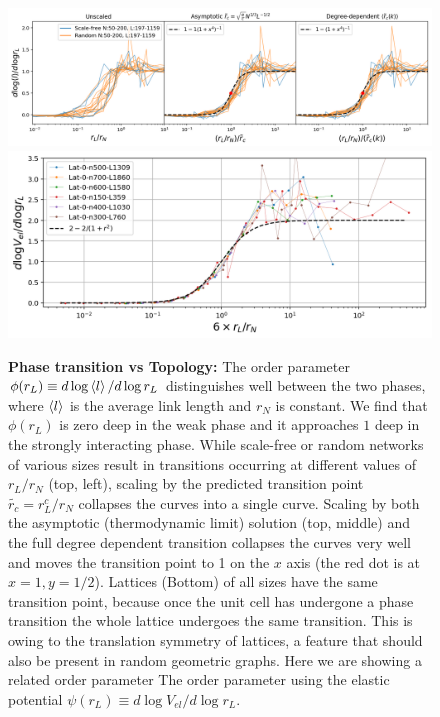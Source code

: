 \documentclass[linenumbers,endfloats,nofootinbib,preprint,floatfix,titlepage,superscriptaddress]{revtex4-1} %
\begin{document}
\begin{figure}
    \centering
    \includegraphics[width=\textwidth]{fig-09-19/phase-collapse-042018.png}
    \includegraphics[width=.6\textwidth]{fig-09-19/phase-lattice-042018.png}
    \caption{{\bf Phase transition vs Topology:} The order parameter $\phi(r_L)\equiv d\log\left<l\right> /d\log r_L$ distinguishes well between the two phases, where $\left<l\right>$ is the average link length and $r_N$ is constant.
    We find that $\phi (r_L) $ is zero deep in the weak phase and it approaches $1$ deep in the strongly interacting phase. 
    While scale-free or random networks of various sizes result in transitions occurring at different values of $r_L/r_N$ (top, left), scaling by the predicted transition point $\tilde{r_c}=r^c_L/r_N$ collapses the curves into a single curve. 
    Scaling by both the asymptotic (thermodynamic limit) solution (top, middle) and the full degree dependent transition collapses the curves very well and moves the transition point to 1 on the $x$ axis (the red dot is at $x=1,y=1/2$).
    Lattices (Bottom) of all sizes have the same transition point, because once the unit cell has undergone a phase transition the whole lattice undergoes the same transition. 
    This is owing to the translation symmetry of lattices, a feature that should also be present in random geometric graphs. 
    Here we are showing a related order parameter The order parameter using the elastic potential $\psi(r_L)\equiv d\log V_{el} /d\log r_L$. 
    }
    \label{fig:phase-collapse}
\end{figure}
\end{document}
